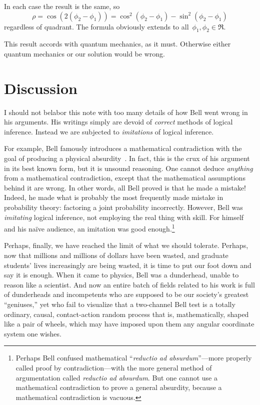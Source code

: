 \documentclass[9pt,technote]{IEEEtran}
\begin{document}
In each case the result is the same, so
\begin{equation}
  \rho = \cos(2(\phi_2-\phi_1)) = \cos^2(\phi_2-\phi_1) - \sin^2(\phi_2-\phi_1)
\end{equation}
regardless of quadrant. The formula obviously extends to
all~$\phi_1,\phi_2\in\Re$.

This result accords with quantum mechanics, as it must. Otherwise
either quantum mechanics or our solution would be wrong.

\section{Discussion}

I should not belabor this note with too many details of how Bell went
wrong in his arguments. His writings simply are devoid of
{\em{correct}} methods of logical inference. Instead we are subjected
to {\em{imitations}} of logical inference.

For example, Bell famously introduces a mathematical contradiction
with the goal of producing a physical
absurdity~\cite{bertlmann:manuscript}. In fact, this is the crux of
his argument in its best known form, but it is unsound reasoning. One
cannot deduce {\em{anything}} from a mathematical contradiction,
except that the mathematical assumptions behind it are wrong. In other
words, all Bell proved is that he made a mistake! Indeed, he made what
is probably the most frequently made mistake in probability theory:
factoring a joint probability incorrectly. However, Bell was
{\em{imitating}} logical inference, not employing the real thing with
skill. For himself and his naïve audience, an imitation was good
enough.\footnote{Perhaps Bell confused mathematical ``{\em{reductio ad
      absurdum}}''---more properly called proof by
  contradiction---with the more general method of argumentation called
  {\em{reductio ad absurdum}}. But one cannot use a mathematical
  contradiction to prove a general absurdity, because a mathematical
  contradiction is vacuous.}

Perhaps, finally, we have reached the limit of what we should
tolerate. Perhaps, now that millions and millions of dollars have been
wasted, and graduate students' lives increasingly are being wasted, it
is time to put our foot down and say it is enough. When it came to
physics, Bell was a dunderhead, unable to reason like a scientist. And
now an entire batch of fields related to his work is full of
dunderheads and incompetents who are supposed to be our society’s
greatest ``geniuses,'' yet who fail to visualize that a two-channel
Bell test is a totally ordinary, causal, contact-action random process
that is, mathematically, shaped like a pair of wheels, which may have
imposed upon them any angular coordinate system one wishes.
\end{document}
